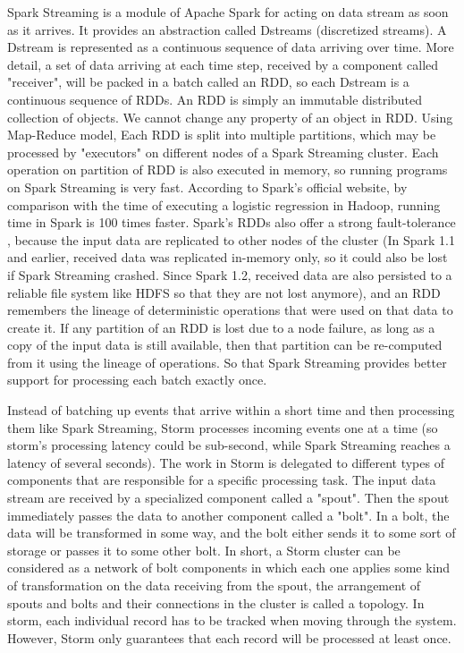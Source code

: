 \documentclass{acm_proc_article-sp}
\begin{document}
Spark Streaming is a module of Apache Spark for acting on data stream as soon as it arrives. It provides an abstraction called Dstreams (discretized streams). A Dstream is represented as a continuous sequence of data arriving over time. More detail, a set of data arriving at each time step, received by a component called "receiver", will be packed in a batch called an RDD, so each Dstream is a continuous sequence of RDDs. An RDD is simply an immutable distributed collection of objects. We cannot change any property of an object in RDD. Using Map-Reduce model, Each RDD is split into multiple partitions, which may be processed by "executors" on different nodes of a Spark Streaming cluster. Each operation on partition of RDD is also executed in memory, so running programs on Spark Streaming is very fast. According to Spark's official website, by comparison with the time of executing a logistic regression in Hadoop, running time in Spark is 100 times faster.
Spark's RDDs also offer a strong fault-tolerance , because the input data are replicated to other nodes of the cluster (In Spark 1.1 and earlier, received data was replicated in-memory only, so it could also be lost if Spark Streaming crashed. Since Spark 1.2, received data are also persisted to a reliable file system like HDFS so that they are not lost anymore), and an RDD remembers the lineage of deterministic operations that were used on that data to create it. If any partition of an RDD is lost due to a node failure, as long as a copy of the input data is still available, then that partition can be re-computed from it using the lineage of operations. So that Spark Streaming provides better support for processing each batch exactly once.

Instead of batching up events that arrive within a short time and then processing them like Spark Streaming, Storm processes incoming events one at a time (so storm’s processing latency could be sub-second, while Spark Streaming reaches a latency of several seconds). The work in Storm is delegated to different types of components that are responsible for a specific processing task. The input data stream are received by a specialized component called a "spout". Then the spout immediately passes the data to another component called a "bolt". In a bolt, the data will be transformed in some way, and the bolt either sends it to some sort of storage or passes it to some other bolt. In short, a Storm cluster can be considered as a network of bolt components in which each one applies some kind of transformation on the data receiving from the spout, the arrangement of spouts and bolts and their connections in the cluster is called a topology. In storm, each individual record has to be tracked when moving through the system. However, Storm only guarantees that each record will be processed at least once.
\end{document}
